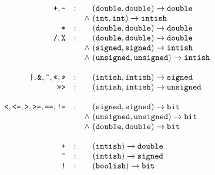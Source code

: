 \documentclass{article}
\newcommand{\funty}[2]{({#1}) \rightarrow {#2}}
\newcommand{\mathjs}[1]{\mbox{\texttt{{#1}}}}
\newcommand{\bit}{\mathtt{bit}}
\newcommand{\unsigned}{\mathtt{unsigned}}
\newcommand{\signed}{\mathtt{signed}}
\newcommand{\double}{\mathtt{double}}
\renewcommand{\int}{\mathtt{int}}
\newcommand{\boolish}{\mathtt{boolish}}
\newcommand{\intish}{\mathtt{intish}}
\begin{document}
\[
\begin{array}{rcc@{\ }l}
\mathjs{+}, \mathjs{-}
                 & : &       & \funty{\double, \double}{\double} \\
                 &   & \land & \funty{\int, \int}{\intish} \\
\mathjs{*}       & : &       & \funty{\double, \double}{\double} \\
\mathjs{/}, \mathjs{\%}
                 & : &       & \funty{\double, \double}{\double} \\
                 &   & \land & \funty{\signed, \signed}{\intish}  \\
                 &   & \land & \funty{\unsigned, \unsigned}{\intish} \\
\\
\mathjs{|}, \mathjs{\&}, \mathjs{\^{}}, \mathjs{<<}, \mathjs{>>}
                 & : &       & \funty{\intish, \intish}{\signed} \\
\mathjs{>>>}     & : &       & \funty{\intish, \intish}{\unsigned} \\
\\
\mathjs{<}, \mathjs{<=}, \mathjs{>}, \mathjs{>=}, \mathjs{==}, \mathjs{!=}
                 & : &       & \funty{\signed, \signed}{\bit} \\
                 &   & \land & \funty{\unsigned, \unsigned}{\bit} \\
                 &   & \land & \funty{\double, \double}{\bit} \\
\\
\mathjs{+}       & : &       & \funty{\intish}{\double} \\
\mathjs{\~{}}    & : &       & \funty{\intish}{\signed} \\
\mathjs{!}       & : &       & \funty{\boolish}{\bit} \\
\end{array}
\]
\end{document}
